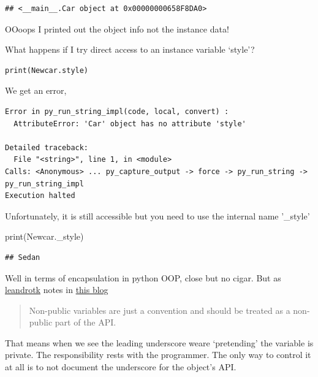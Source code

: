 \documentclass[]{book}
\newenvironment{Shaded}{\begin{snugshade}}{\end{snugshade}}
\newcommand{\BuiltInTok}[1]{#1}
\newcommand{\NormalTok}[1]{#1}
\theoremstyle{definition}
\theoremstyle{definition}
\theoremstyle{definition}
\theoremstyle{remark}
\begin{document}
\begin{verbatim}
## <__main__.Car object at 0x00000000658F8DA0>
\end{verbatim}

OOoops I printed out the object info
 not the instance data!

What happens if I try direct access to an instance variable `style'?

\begin{verbatim}
print(Newcar.style)
\end{verbatim}

We get an error,

\begin{verbatim}
Error in py_run_string_impl(code, local, convert) : 
  AttributeError: 'Car' object has no attribute 'style'

Detailed traceback: 
  File "<string>", line 1, in <module>
Calls: <Anonymous> ... py_capture_output -> force -> py_run_string -> py_run_string_impl
Execution halted
\end{verbatim}

Unfortunately, it is still accessible but you need to use the internal
name '\_style'

\begin{Shaded}
\begin{Highlighting}[]
\BuiltInTok{print}\NormalTok{(Newcar._style)}
\end{Highlighting}
\end{Shaded}

\begin{verbatim}
## Sedan
\end{verbatim}

Well in terms of encapsulation in python OOP, close but no cigar. But as
\href{https://medium.com/@leandrotk_}{leandrotk} notes in
\href{https://medium.com/the-renaissance-developer/python-101-object-oriented-programming-part-2-8e0db3ddd531}{this
blog} 

\begin{quote}
Non-public variables are just a convention and should be treated as a
non-public part of the API.
\end{quote}

That means when we see the leading underscore 
weare `pretending' the variable is private. The responsibility rests
with the programmer. The only way to control it at all is to not
document the underscore for the object's API.
\end{document}
